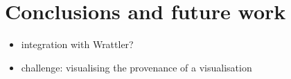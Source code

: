 \section{Conclusions and future work}
\label{sec:conclusion}

\begin{itemize}
  \item integration with Wrattler?
  \item challenge: visualising the provenance of a visualisation
\end{itemize}

\begin{comment}
There are a number of challenges associated with making our approach practical
and appealing to actual data scientists. A central usability challenge is
visualising these complex relationships between the various parts of a
visualisation and the relevant data and/or visualisation code. This is
essentially a higher-order visualisation problem: visualising information about
the provenance of visualisations. Ideas from temporal data visualisation
\cite{bach16}, data-driven storytelling \cite{bach18}, and ``literate''
visualisation \cite{wood19} may inform our efforts here.
\end{comment}
